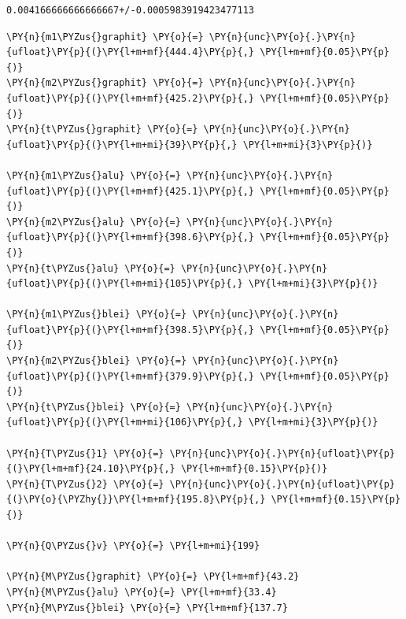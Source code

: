            \begin{tcolorbox}[breakable, size=fbox, boxrule=.5pt, pad at break*=1mm, opacityfill=0]
\begin{Verbatim}[commandchars=\\\{\}]
0.004166666666666667+/-0.0005983919423477113
\end{Verbatim}
\end{tcolorbox}
        
    \begin{tcolorbox}[breakable, size=fbox, boxrule=1pt, pad at break*=1mm,colback=cellbackground, colframe=cellborder]
\begin{Verbatim}[commandchars=\\\{\}]
\PY{n}{m1\PYZus{}graphit} \PY{o}{=} \PY{n}{unc}\PY{o}{.}\PY{n}{ufloat}\PY{p}{(}\PY{l+m+mf}{444.4}\PY{p}{,} \PY{l+m+mf}{0.05}\PY{p}{)}
\PY{n}{m2\PYZus{}graphit} \PY{o}{=} \PY{n}{unc}\PY{o}{.}\PY{n}{ufloat}\PY{p}{(}\PY{l+m+mf}{425.2}\PY{p}{,} \PY{l+m+mf}{0.05}\PY{p}{)}
\PY{n}{t\PYZus{}graphit} \PY{o}{=} \PY{n}{unc}\PY{o}{.}\PY{n}{ufloat}\PY{p}{(}\PY{l+m+mi}{39}\PY{p}{,} \PY{l+m+mi}{3}\PY{p}{)}

\PY{n}{m1\PYZus{}alu} \PY{o}{=} \PY{n}{unc}\PY{o}{.}\PY{n}{ufloat}\PY{p}{(}\PY{l+m+mf}{425.1}\PY{p}{,} \PY{l+m+mf}{0.05}\PY{p}{)}
\PY{n}{m2\PYZus{}alu} \PY{o}{=} \PY{n}{unc}\PY{o}{.}\PY{n}{ufloat}\PY{p}{(}\PY{l+m+mf}{398.6}\PY{p}{,} \PY{l+m+mf}{0.05}\PY{p}{)}
\PY{n}{t\PYZus{}alu} \PY{o}{=} \PY{n}{unc}\PY{o}{.}\PY{n}{ufloat}\PY{p}{(}\PY{l+m+mi}{105}\PY{p}{,} \PY{l+m+mi}{3}\PY{p}{)}

\PY{n}{m1\PYZus{}blei} \PY{o}{=} \PY{n}{unc}\PY{o}{.}\PY{n}{ufloat}\PY{p}{(}\PY{l+m+mf}{398.5}\PY{p}{,} \PY{l+m+mf}{0.05}\PY{p}{)}
\PY{n}{m2\PYZus{}blei} \PY{o}{=} \PY{n}{unc}\PY{o}{.}\PY{n}{ufloat}\PY{p}{(}\PY{l+m+mf}{379.9}\PY{p}{,} \PY{l+m+mf}{0.05}\PY{p}{)}
\PY{n}{t\PYZus{}blei} \PY{o}{=} \PY{n}{unc}\PY{o}{.}\PY{n}{ufloat}\PY{p}{(}\PY{l+m+mi}{106}\PY{p}{,} \PY{l+m+mi}{3}\PY{p}{)}

\PY{n}{T\PYZus{}1} \PY{o}{=} \PY{n}{unc}\PY{o}{.}\PY{n}{ufloat}\PY{p}{(}\PY{l+m+mf}{24.10}\PY{p}{,} \PY{l+m+mf}{0.15}\PY{p}{)}
\PY{n}{T\PYZus{}2} \PY{o}{=} \PY{n}{unc}\PY{o}{.}\PY{n}{ufloat}\PY{p}{(}\PY{o}{\PYZhy{}}\PY{l+m+mf}{195.8}\PY{p}{,} \PY{l+m+mf}{0.15}\PY{p}{)}

\PY{n}{Q\PYZus{}v} \PY{o}{=} \PY{l+m+mi}{199}

\PY{n}{M\PYZus{}graphit} \PY{o}{=} \PY{l+m+mf}{43.2}
\PY{n}{M\PYZus{}alu} \PY{o}{=} \PY{l+m+mf}{33.4}
\PY{n}{M\PYZus{}blei} \PY{o}{=} \PY{l+m+mf}{137.7}



\end{Verbatim}
\end{tcolorbox}
